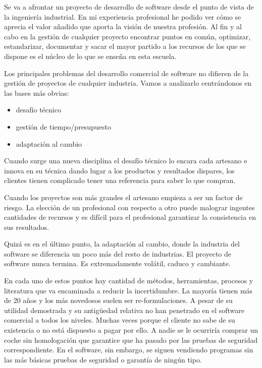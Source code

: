  
Se va a afrontar un proyecto de desarrollo de software desde el punto de vista de la ingeniería industrial. En mi experiencia profesional he podido ver cómo se aprecia el valor añadido que aporta la visión de nuestra profesión. Al fin y al cabo en la gestión de cualquier proyecto encontrar puntos en común, optimizar, estandarizar, documentar y sacar el mayor partido a los recursos de los que se dispone es el núcleo de lo que se enseña en esta escuela.
 
Los principales problemas del desarrollo comercial de software no difieren de la gestión de proyectos de cualquier industria. Vamos a analizarlo centrándonos en las bases más obvias: 

\begin{itemize}
 	\item desafío técnico
	\item gestión de tiempo/presupuesto
	\item adaptación al cambio
\end{itemize} 

Cuando surge una nueva disciplina el desafío técnico lo encara cada artesano e innova en su técnica dando lugar a los productos y resultados dispares, los clientes tienen complicado tener una referencia para saber lo que compran.

Cuando los proyectos son más grandes el artesano empieza a ser un factor de riesgo. La elección de un profesional con respecto a otro puede malograr ingentes cantidades de recursos y es difícil para el profesional garantizar la consistencia en sus resultados.

Quizá es en el último punto, la adaptación al cambio, donde la industria del software se diferencia un poco más del resto de industrias. El proyecto de software nunca termina. Es extremadamente volátil, caduco y cambiante.

En cada uno de estos puntos hay cantidad de métodos, herramientas, procesos y literatura que va encaminada a reducir la incertidumbre. La mayoría tienen más de 20 años y los más novedosos suelen ser re-formulaciones. A pesar de su utilidad demostrada y su antigüedad relativa no han penetrado en el software comercial a todos los niveles. Muchas veces porque el cliente no sabe de su existencia o no está dispuesto a pagar por ello. A nadie se le ocurriría comprar un coche sin homologación que garantice que ha pasado por las pruebas de seguridad correspondiente. En el software, sin embargo, se siguen vendiendo programas sin las más básicas pruebas de seguridad o garantía de ningún tipo.

